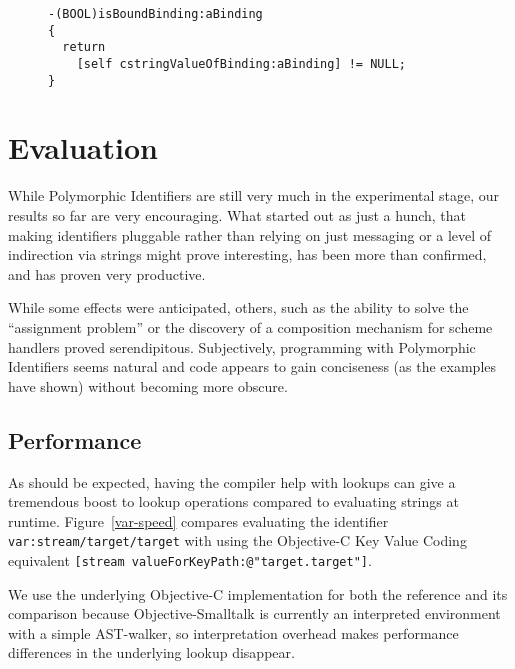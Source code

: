 \documentclass[preprint,authoryear]{llncs}
\begin{document}
\begin{figure}[htbp]
\begin{lstlisting}[style=L,label=hasValue-env,caption=Checking for presence of value in env: scheme.]
-(BOOL)isBoundBinding:aBinding
{
  return 
    [self cstringValueOfBinding:aBinding] != NULL;
}
\end{lstlisting}
\end{figure}




\section{Evaluation}
\label{evaluation}

While Polymorphic Identifiers are still very much in the experimental stage, our
results so far are very encouraging.  What started out as just a hunch, that making
identifiers pluggable rather than relying on just messaging or a level of indirection
via strings might prove interesting, has been more than confirmed, and has proven
very productive.

While some effects were anticipated, others, such as the ability to solve the
``assignment problem'' or the discovery of a composition mechanism for
scheme handlers proved serendipitous.  Subjectively, programming with Polymorphic
Identifiers seems natural and code appears to gain conciseness (as the examples
have shown) without becoming more obscure.


\subsection{Performance}

As should be expected, having the compiler help with lookups can give a tremendous
boost to lookup operations compared to evaluating strings at runtime.  Figure~\ref{var-speed} 
compares evaluating the identifier {\tt var:stream/target/target} with using the Objective-C 
Key Value Coding equivalent {\tt [stream valueForKeyPath:@"target.target"]}.

We use the underlying Objective-C implementation for both the reference and its 
comparison because Objective-Smalltalk is currently an interpreted environment with
a simple AST-walker, so interpretation overhead makes performance differences in
the underlying lookup disappear.
\end{document}
